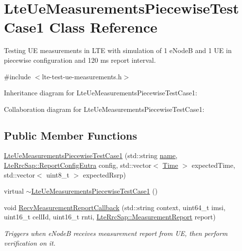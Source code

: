 \hypertarget{classLteUeMeasurementsPiecewiseTestCase1}{}\section{Lte\+Ue\+Measurements\+Piecewise\+Test\+Case1 Class Reference}
\label{classLteUeMeasurementsPiecewiseTestCase1}


Testing UE measurements in L\+TE with simulation of 1 e\+NodeB and 1 UE in piecewise configuration and 120 ms report interval.  




{\ttfamily \#include $<$lte-\/test-\/ue-\/measurements.\+h$>$}



Inheritance diagram for Lte\+Ue\+Measurements\+Piecewise\+Test\+Case1\+:


Collaboration diagram for Lte\+Ue\+Measurements\+Piecewise\+Test\+Case1\+:
\subsection*{Public Member Functions}
\begin{DoxyCompactItemize}
\item 
\hyperlink{classLteUeMeasurementsPiecewiseTestCase1_a4067f3ef8a2e1c51bbe9da1a7d9ed8f1}{Lte\+Ue\+Measurements\+Piecewise\+Test\+Case1} (std\+::string \hyperlink{generate__test__data__lte__spectrum__model_8m_ab74e6bf80237ddc4109968cedc58c151}{name}, \hyperlink{structns3_1_1LteRrcSap_1_1ReportConfigEutra}{Lte\+Rrc\+Sap\+::\+Report\+Config\+Eutra} config, std\+::vector$<$ \hyperlink{classns3_1_1Time}{Time} $>$ expected\+Time, std\+::vector$<$ uint8\+\_\+t $>$ expected\+Rsrp)
\item 
virtual \hyperlink{classLteUeMeasurementsPiecewiseTestCase1_a7152129def46642793db235cd240df8c}{$\sim$\+Lte\+Ue\+Measurements\+Piecewise\+Test\+Case1} ()
\item 
void \hyperlink{classLteUeMeasurementsPiecewiseTestCase1_ae988ab7a4e0a6f8065868b31429a061a}{Recv\+Measurement\+Report\+Callback} (std\+::string context, uint64\+\_\+t imsi, uint16\+\_\+t cell\+Id, uint16\+\_\+t rnti, \hyperlink{structns3_1_1LteRrcSap_1_1MeasurementReport}{Lte\+Rrc\+Sap\+::\+Measurement\+Report} report)
\begin{DoxyCompactList}\small\item\em Triggers when e\+NodeB receives measurement report from UE, then perform verification on it. \end{DoxyCompactList}\end{DoxyCompactItemize}
